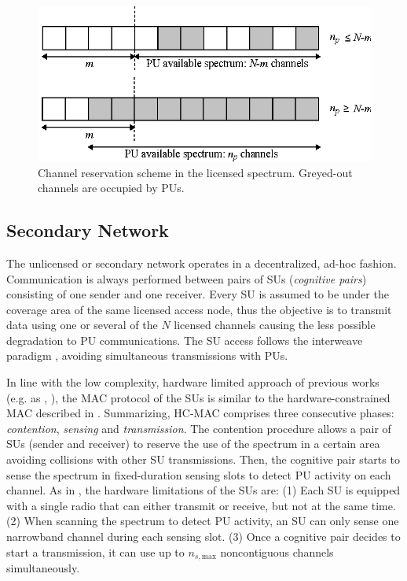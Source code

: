 \begin{figure}[ht]
\centering
\includegraphics[scale=0.9]{channelReservation.eps}
\caption[]{Channel reservation scheme in the licensed spectrum. Greyed-out channels are occupied by PUs.}\label{BR_fig_allocation}
\end{figure}

\subsection{Secondary Network}\label{secondarynetwork}
The unlicensed or secondary network operates in a decentralized, ad-hoc fashion. 
Communication is always performed between pairs of SUs (\textit{cognitive pairs}) consisting of one sender and one receiver.
Every SU is assumed to be under the coverage area of the same licensed access node, thus the objective is to transmit data using one or several of the $N$ licensed channels causing the less possible degradation to PU communications. The SU access follows the interweave paradigm \cite{ref:Biglieri2012}, avoiding simultaneous transmissions with PUs.

In line with the low complexity, hardware limited approach of previous works (e.g. \cite{ref:Pawelczak2009} as \cite{ref:Jia2008_HC}, \cite{ref:Li2012}), the MAC protocol of the SUs is similar to the hardware-constrained MAC described in \cite{ref:Jia2008_HC}.
Summarizing, HC-MAC comprises three consecutive phases: \textit{contention}, \textit{sensing} and \textit{transmission}.
The contention procedure allows a pair of SUs (sender and receiver) to reserve the use of the spectrum in a certain area avoiding collisions with other SU transmissions.
Then, the cognitive pair starts to sense the spectrum in fixed-duration sensing slots to detect PU activity on each channel. 
As in \cite{ref:Jia2008_HC}, the hardware limitations of the SUs are:
(1) Each SU is equipped with a single radio that can either transmit or receive, but not at the same time.
(2) When scanning the spectrum to detect PU activity, an SU can only sense one narrowband channel during each sensing slot.
(3) Once a cognitive pair decides to start a transmission, it can use up to $n_{s,\text{max}}$ noncontiguous channels simultaneously. 

